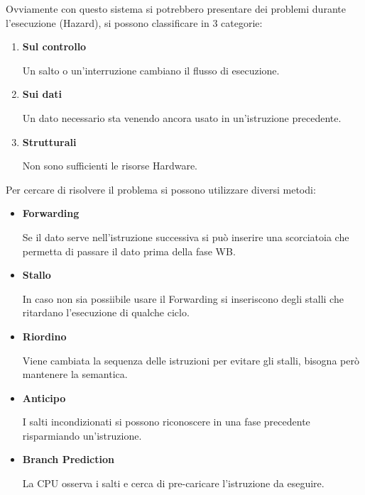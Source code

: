 \documentclass{article}
\begin{document}
Ovviamente con questo sistema si potrebbero presentare dei problemi durante l'esecuzione (Hazard), si possono classificare in 3 categorie:
\begin{enumerate}
    \item \textbf{Sul controllo}

        Un salto o un'interruzione cambiano il flusso di esecuzione.
    
    \item \textbf{Sui dati}

        Un dato necessario sta venendo ancora usato in un'istruzione precedente.

    \item \textbf{Strutturali}

        Non sono sufficienti le risorse Hardware.\newline
    
\end{enumerate}

\noindent Per cercare di risolvere il problema si possono utilizzare diversi metodi:
\begin{itemize}
    \item \textbf{Forwarding}

        Se il dato serve nell'istruzione successiva si può inserire una scorciatoia che permetta di passare il dato prima della fase WB.

    \item \textbf{Stallo}

        In caso non sia possiibile usare il Forwarding si inseriscono degli stalli che ritardano l'esecuzione di qualche ciclo.

    \item \textbf{Riordino}

        Viene cambiata la sequenza delle istruzioni per evitare gli stalli, bisogna però mantenere la semantica.

    \item \textbf{Anticipo}

        I salti incondizionati si possono riconoscere in una fase precedente risparmiando un'istruzione. 

    \item \textbf{Branch Prediction}

        La CPU osserva i salti e cerca di pre-caricare l'istruzione da eseguire.
    
\end{itemize}

\newpage
\end{document}
